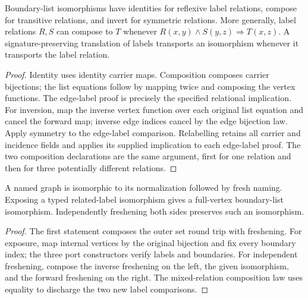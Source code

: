 
\begin{lemma}
Boundary-list isomorphisms have identities for reflexive label relations,
compose for transitive relations, and invert for symmetric relations. More
generally, label relations $R,S$ can compose to $T$ whenever
$R(x,y)\wedge S(y,z)\Rightarrow T(x,z)$. A signature-preserving translation of
labels transports an isomorphism whenever it transports the label relation.
\end{lemma}
\begin{proof}
Identity uses identity carrier maps. Composition composes carrier bijections;
the list equations follow by mapping twice and composing the vertex functions.
The edge-label proof is precisely the specified relational implication.
For inversion, map the inverse vertex function over each original list equation
and cancel the forward map; inverse edge indices cancel by the edge bijection
law. Apply symmetry to the edge-label comparison. Relabelling retains all
carrier and incidence fields and applies its supplied implication to each
edge-label proof. The two composition declarations are the same argument,
first for one relation and then for three potentially different relations.
\end{proof}



\begin{lemma}
A named graph is isomorphic to its normalization followed by fresh naming.
Exposing a typed related-label isomorphism gives a full-vertex boundary-list
isomorphism. Independently freshening both sides preserves such an isomorphism.
\end{lemma}
\begin{proof}
The first statement composes the outer set round trip with freshening. For
exposure, map internal vertices by the original bijection and fix every boundary
index; the three port constructors verify labels and boundaries. For independent
freshening, compose the inverse freshening on the left, the given isomorphism,
and the forward freshening on the right. The mixed-relation composition law
uses equality to discharge the two new label comparisons.
\end{proof}

